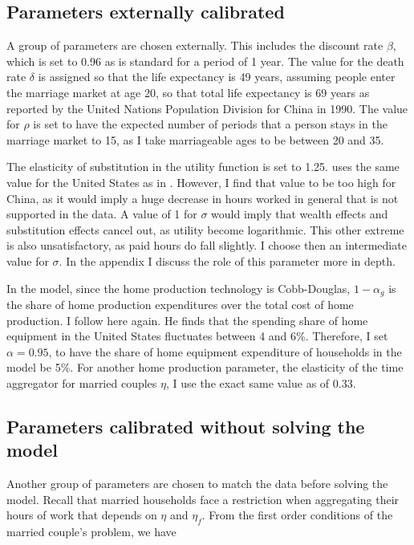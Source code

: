 \documentclass[12pt]{article}
\begin{document}
\subsection{Parameters externally calibrated}

A group of parameters are chosen externally. This includes the discount rate $\beta$, which is set to 0.96 as is standard for a period of 1 year. The value for the death rate $\delta$ is assigned so that the life expectancy is 49 years, assuming people enter the marriage market at age 20, so that total life expectancy is 69 years as reported by the United Nations Population Division for China in 1990. The value for $\rho$ is set to have the expected number of periods that a person stays in the marriage market to 15, as I take marriageable ages to be between 20 and 35.

The elasticity of substitution in the utility function is set to 1.25. \cite{knowles13} uses the same value for the United States as in \cite{attanasioetal08}. However, I find that value to be too high for China, as it would imply a huge decrease in hours worked in general that is not supported in the data. A value of 1 for $\sigma$ would imply that wealth effects and substitution effects cancel out, as utility become logarithmic. This other extreme is also unsatisfactory, as paid hours do fall slightly. I choose then an intermediate value for $\sigma$. In the appendix I discuss the role of this parameter more in depth.

In the model, since the home production technology is Cobb-Douglas, $1-\alpha_g$ is the share of home production expenditures over the total cost of home production. I follow \cite{knowles13} here again. He finds that the spending share of home equipment in the United States fluctuates between 4 and 6\%. Therefore, I set $\alpha=0.95$, to have the share of home equipment expenditure of households in the model be 5\%. For another home production parameter, the elasticity of the time aggregator for married couples $\eta$, I use the exact same value as \cite{knowles13} of 0.33.

\subsection{Parameters calibrated without solving the model}

Another group of parameters are chosen to match the data before solving the model. Recall that married households face a restriction when aggregating their hours of work that depends on $\eta$ and $\eta_f$. From the first order conditions of the married couple's problem, we have
\end{document}
